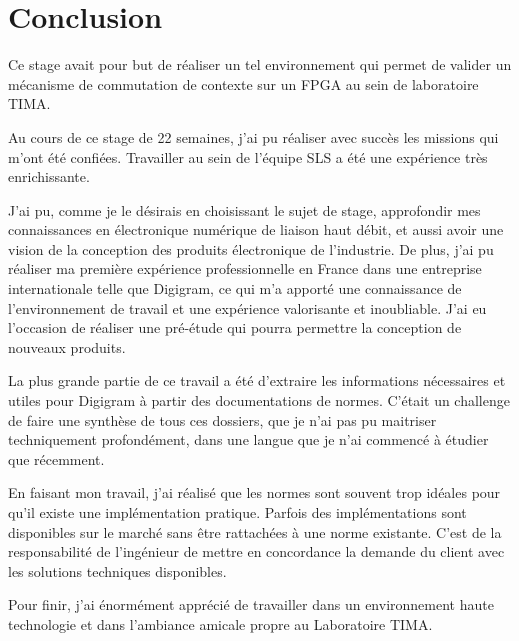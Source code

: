 \chapter{Conclusion}

Ce stage avait pour but de réaliser un tel environnement qui permet de valider un mécanisme de
commutation de contexte sur un FPGA au sein de laboratoire TIMA.

Au cours de ce stage de 22 semaines, j’ai pu réaliser avec succès les missions qui m’ont été confiées.
Travailler au sein de l’équipe SLS a été une expérience très enrichissante. 

J’ai pu, comme je le désirais en choisissant le sujet de stage, approfondir mes connaissances 
en électronique numérique de liaison haut débit, et aussi avoir une vision de la conception des produits électronique de l’industrie.
De plus, j’ai pu réaliser ma première expérience professionnelle en France dans une entreprise internationale
telle que Digigram, ce qui m’a apporté une connaissance de l’environnement de travail et une expérience valorisante et inoubliable.
J’ai eu l’occasion de réaliser une pré-étude qui pourra permettre la conception de nouveaux produits. 

La plus grande partie de ce travail a été d’extraire les informations nécessaires et utiles pour Digigram 
à partir des documentations de normes. C’était un challenge de faire une synthèse de tous ces dossiers, 
que je n’ai pas pu maitriser techniquement profondément, dans une langue que je n’ai commencé à étudier que récemment.

En faisant mon travail, j’ai réalisé que les normes sont souvent trop idéales pour qu’il existe une implémentation pratique. 
Parfois des implémentations sont disponibles sur le marché sans être rattachées à une norme existante. 
C’est de la responsabilité de l’ingénieur de mettre en concordance la demande du client avec les solutions techniques disponibles.

Pour finir, j’ai énormément apprécié de travailler dans un environnement haute technologie et dans l’ambiance amicale propre au Laboratoire TIMA.
